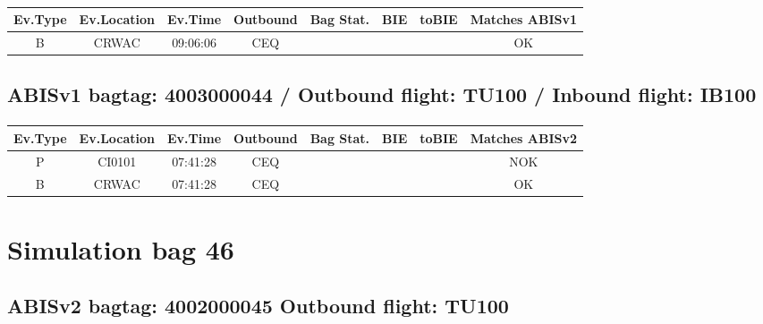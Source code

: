 \documentclass{report}
\begin{document}
\paragraph{}
\begin{longtable}{cccccccc}    \toprule
\rowcolor{white!50}
\textbf{Ev.Type} & \textbf{Ev.Location} & \textbf{Ev.Time} & \textbf{Outbound} & \textbf{Bag Stat.} & \textbf{BIE} & \textbf{toBIE} & \textbf{Matches ABISv1} \\\midrule
B & CRWAC & 09:06:06  & CEQ &  &  &  & OK\\
\bottomrule
\end{longtable}
\subsection*{ABISv1 bagtag: 4003000044 / Outbound flight: TU100 / Inbound flight: IB100}
\paragraph{}
\begin{longtable}{cccccccc}    \toprule
\rowcolor{white!50}
\textbf{Ev.Type} & \textbf{Ev.Location} & \textbf{Ev.Time} & \textbf{Outbound} & \textbf{Bag Stat.} & \textbf{BIE} & \textbf{toBIE} & \textbf{Matches ABISv2} \\\midrule
P & CI0101 & 07:41:28  & CEQ &  &  &  & NOK\\
B & CRWAC & 07:41:28  & CEQ &  &  &  & OK\\
\bottomrule
\end{longtable}
\pagebreak
\section*{Simulation bag 46}
\subsection*{ABISv2 bagtag: 4002000045 Outbound flight: TU100}
\end{document}
